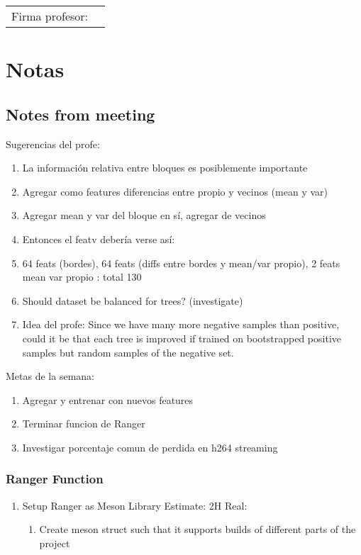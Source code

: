 \documentclass[12pt,oneside]{book}
\begin{document}
  \begin{tabular}{p{3 cm} p{10 cm}}
    Firma profesor: & \\
    \cline{2-2}
  \end{tabular}

  \newpage

  \section{Notas}
  \setlength\parindent{0pt}

  \subsection{Notes from meeting}

  Sugerencias del profe:
  \begin{enumerate}
    \item La información relativa entre bloques es posiblemente importante
    \item Agregar como features diferencias entre propio y vecinos (mean y var)
    \item Agregar mean y var del bloque en sí, agregar de vecinos
    \item Entonces el featv debería verse así:
    \item 64 feats (bordes), 64 feats (diffs entre bordes y mean/var propio), 2 feats mean var propio : total 130
    \item Should dataset be balanced for trees? (investigate)
    \item Idea del profe: Since we have many more negative samples than positive, could it be that each tree is improved if trained on bootstrapped positive samples but random samples of the negative set.
  \end{enumerate}

  Metas de la semana:
  \begin{enumerate}
    \item Agregar y entrenar con nuevos features
    \item Terminar funcion de Ranger
    \item Investigar porcentaje comun de perdida en h264 streaming
  \end{enumerate}

  \subsubsection*{Ranger Function}%
  \begin{enumerate}
    \item Setup Ranger as Meson Library Estimate: 2H Real: 
    \begin{enumerate}
      \item Create meson struct such that it supports builds of different parts of the project
    \end{enumerate}
  \end{enumerate}
\end{document}
